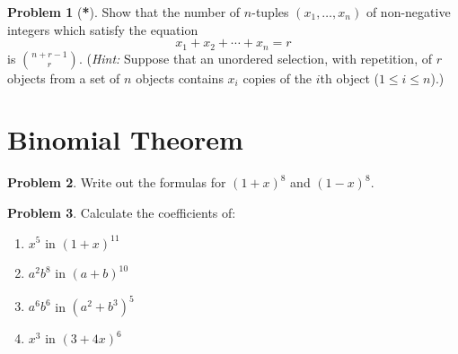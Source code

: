 \documentclass[12pt,a4paper]{article}
\numberwithin{equation}{section}
\theoremstyle{plain}
\theoremstyle{definition}
\newtheorem{problem}{Problem}
\begin{document}
\begin{problem}[\textbf{*}]
	Show that the number of $n$-tuples $(x_1, \ldots, x_n)$ of non-negative integers which satisfy the equation 
	\[
	x_1 + x_2 + \cdots + x_n = r
	\]
	is $\binom{n+r-1}{r}$. (\emph{Hint:} Suppose that an unordered selection, with repetition, of $r$ objects from a set of $n$ objects contains $x_i$ copies of the $i$th object ($1 \leq i \leq n$).)
\end{problem}

\section*{Binomial Theorem}

\begin{problem}
	Write out the formulas for $(1+x)^8$ and $(1-x)^8$. 
\end{problem}

\begin{problem}
	Calculate the coefficients of: 
	\begin{enumerate}[label=(\alph*)]
		\item $x^5$ in $(1+x)^{11}$
		\item $a^2b^8$ in $(a+b)^{10}$
		\item $a^6 b^6$ in $(a^2 + b^3)^5$
		\item $x^3$ in $(3+4x)^6$
	\end{enumerate}
\end{problem}
\end{document}
